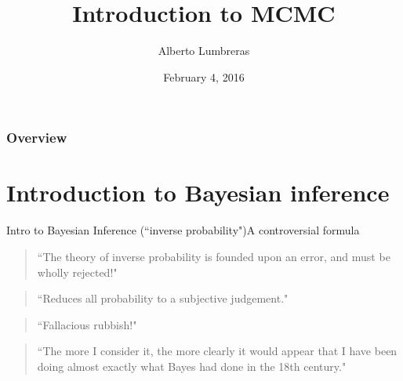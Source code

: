 \documentclass{beamer}
\begin{document}

	
\title{Introduction to MCMC}
\author{Alberto Lumbreras}
\date{February 4, 2016}
\maketitle

\begin{frame}\frametitle{Overview} 
\begin{NoHyper}
\tableofcontents
\end{NoHyper}
\end{frame}

\section{Introduction to Bayesian inference}
\begin{frame}{Intro to Bayesian Inference (``inverse probability")}{A controversial formula}

	\begin{quote}
	{\color{red}``The theory of inverse probability is founded upon an error, and must be wholly rejected!"}  
	\end{quote} 
	\begin{quote}
	{\color{red}``Reduces all probability to a subjective judgement."}  
\end{quote} 
	\begin{quote}
	{\color{red}``Fallacious rubbish!"} 
	\end{quote}

	\begin{quote}
	``The more I consider it, the more clearly it would appear that I have been doing almost exactly what Bayes had done in the 18th century."
	\end{quote} 
\end{frame}
\end{document}
